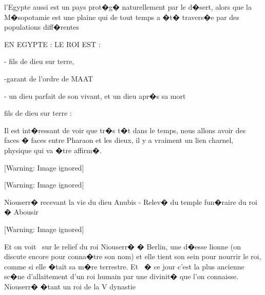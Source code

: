 \documentclass{article}
\begin{document}
l'Egypte aussi est un pays prot�g� naturellement par le d�sert, alors que la M�sopotamie est une plaine qui de tout temps a �t� travers�e par des populations diff�rentes


\bigskip


\bigskip


\bigskip

EN EGYPTE : LE ROI EST :


\bigskip

{}- fils de dieu sur terre,

{}-garant de l'ordre de MAAT

{}- un dieu parfait de son vivant, et un dieu apr�s sa mort


\bigskip


\bigskip

fils de dieu sur terre : 


\bigskip

Il est int�ressant de voir que tr�s t�t dans le temps, nous allons avoir des faces � faces entre Pharaon et les dieux, il y a vraiment un lien charnel, physique qui va �tre affirm�.


\bigskip

  [Warning: Image ignored] %
 


\bigskip

  [Warning: Image ignored] %
 

Niouserr� recevant la vie du dieu Anubis - Relev� du temple fun�raire du roi � Abousir


\bigskip

  [Warning: Image ignored] %
 


\bigskip

Et on voit \ sur le relief du roi Niouserr� � Berlin, une d�esse lionne (on discute encore pour conna�tre son nom) et elle tient son sein pour nourrir le roi, comme si elle �tait sa m�re terrestre. Et \ � ce jour c'est la plus ancienne sc�ne d'allaitement d'un roi humain par une divinit� que l'on connaisse. Niouserr� �tant un roi de la V dynastie


\bigskip
\end{document}
